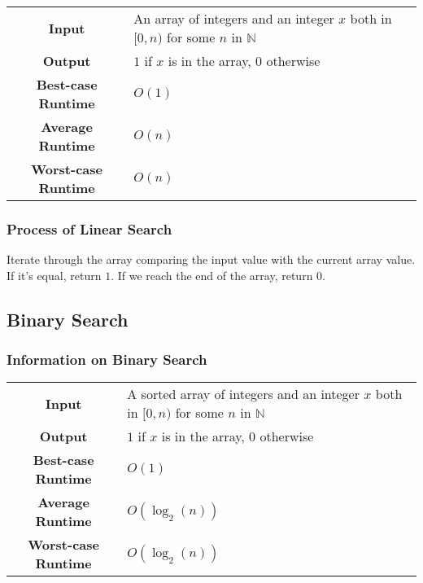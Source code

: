 \documentclass[a4paper, 12pt, twoside]{article}
\begin{document}
\begin{center}
      \begin{tabular}{ || c | p{8.5cm} || }
            \hline
                  \textbf{Input} & An array of integers and an integer
                        $x$ both in $[0, n)$ for some $n$ in $\mathbb{N}$ \\
                  \textbf{Output} & $1$ if $x$ is in the array, $0$
                        otherwise \\
            \hline\hline
                  \textbf{Best-case Runtime} & $O(1)$ \\
                  \textbf{Average Runtime} & $O(n)$ \\
                  \textbf{Worst-case Runtime} & $O(n)$ \\
            \hline
      \end{tabular}
\end{center}

\subsubsection{Process of Linear Search}

Iterate through the array comparing the input value with the current
array value. If it's equal, return $1$. If we reach the end of the
array, return $0$.

\subsection{Binary Search}

\subsubsection{Information on Binary Search}

\begin{center}
      \begin{tabular}{ || c | p{8.5cm} || }
            \hline
                  \textbf{Input} & A sorted array of integers and 
                        an integer $x$ both in $[0, n)$ for some $n$
                        in $\mathbb{N}$ \\
                  \textbf{Output} & $1$ if $x$ is in the array, $0$
                        otherwise \\
            \hline\hline
                  \textbf{Best-case Runtime} & $O(1)$ \\
                  \textbf{Average Runtime} & $O(\log_2(n))$ \\
                  \textbf{Worst-case Runtime} & $O(\log_2(n))$ \\
            \hline
      \end{tabular}
\end{center}
\end{document}
